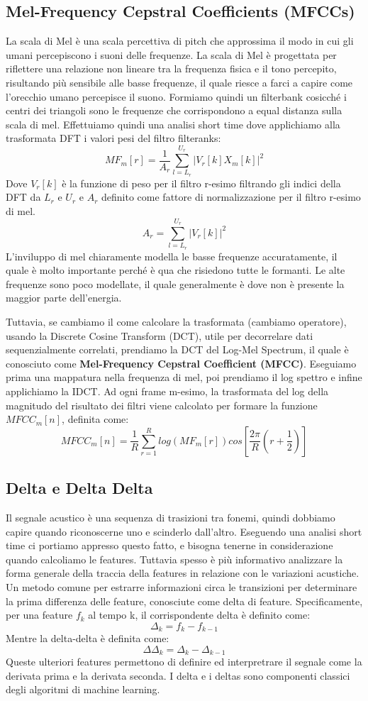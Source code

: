 \subsection{Mel-Frequency Cepstral Coefficients (MFCCs) }
La scala di Mel è una scala percettiva di pitch che approssima il modo in cui gli umani percepiscono i suoni delle frequenze. La scala di Mel è progettata per riflettere una relazione
non lineare tra la frequenza fisica e il tono percepito, risultando più sensibile alle basse frequenze, il quale riesce a farci a capire come l'orecchio umano percepisce
il suono. Formiamo quindi un filterbank cosicché i centri dei triangoli sono le frequenze che corrispondono a equal distanza sulla scala di mel. Effettuiamo quindi
una analisi short time dove applichiamo alla trasformata DFT i valori pesi del filtro filteranks:
\[ MF_m[r] = \frac{1}{A_r} \sum_{l=L_r}^{U_r} |V_r[k]X_m[k]|^2\]
Dove $V_r[k]$ è la funzione di peso per il filtro r-esimo filtrando gli indici della DFT da $L_r$ e $U_r$ e $A_r$ definito come fattore di normalizzazione per il filtro r-esimo di mel. 
\[ A_r =\sum_{l=L_r}^{U_r} |V_r[k]|^2\]
L'inviluppo di mel chiaramente modella le basse frequenze accuratamente, il quale è molto importante perché è qua che risiedono tutte le formanti. 
Le alte frequenze sono poco modellate, il quale generalmente è dove non è presente la maggior parte dell'energia. 

Tuttavia, se cambiamo il come calcolare la trasformata (cambiamo operatore), usando la Discrete Cosine Transform (DCT), utile per decorrelare dati sequenzialmente correlati,
prendiamo la DCT del Log-Mel Spectrum, il quale è conosciuto come \textbf{Mel-Frequency Cepstral Coefficient (MFCC)}. Eseguiamo prima una mappatura nella frequenza di mel,
poi prendiamo il log spettro e infine applichiamo la IDCT. Ad ogni frame m-esimo, la trasformata del log della magnitudo del risultato dei filtri viene calcolato per 
formare la funzione \textbf{$MFCC_m[n]$}, definita come:
\[ MFCC_m[n] = \frac{1}{R}\sum_{r=1}^{R}log(MF_m[r])cos\left[ \frac{2\pi}{R} \left( r + \frac{1}{2} \right) \right]\]

\subsection{Delta e Delta Delta}
Il segnale acustico è una sequenza di trasizioni tra fonemi, quindi dobbiamo capire quando riconoscerne uno e scinderlo dall'altro. Eseguendo una analisi short time ci portiamo
appresso questo fatto, e bisogna tenerne in considerazione quando calcoliamo le features. Tuttavia spesso è più informativo analizzare la forma generale della traccia
della features in relazione con le variazioni acustiche. Un metodo comune per estrarre informazioni circa le transizioni per determinare la prima differenza delle 
feature, conosciute come delta di feature. Specificamente, per una feature $f_k$ al tempo k, il corrispondente delta è definito come:
\[ \Delta _k = f_k - f_{k-1}\]
Mentre la delta-delta è definita come:
\[ \Delta \Delta_k = \Delta_k - \Delta_{k-1} \]
Queste ulteriori features permettono di definire  ed interpretrare il segnale come la derivata prima e la derivata seconda. I delta e i deltas sono componenti 
classici degli algoritmi di machine learning.

